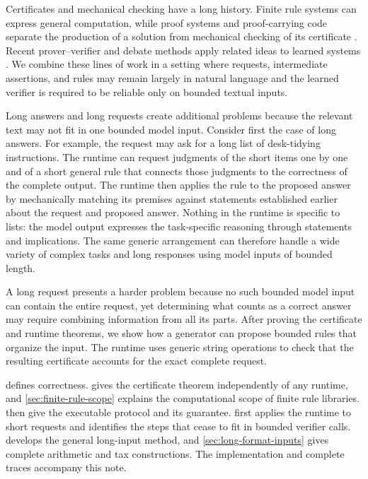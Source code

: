 \documentclass[11pt,twoside]{article}
\theoremstyle{definition}
\begin{document}
Certificates and mechanical checking have a long history. Finite rule systems
can express general computation, while proof systems and proof-carrying code
separate the production of a solution from mechanical checking of its
certificate \cite{post,cook-reckhow,necula-pcc}. Recent prover--verifier and
debate methods apply related ideas to learned systems
\cite{cobbe-verifiers,irving-debate,brown-cohen-debate,kirchner-legibility}.
We combine these lines of work in a setting where requests, intermediate
assertions, and rules may remain largely in natural language and the learned
verifier is required to be reliable only on bounded textual inputs.

Long answers and long requests create additional problems because the relevant
text may not fit in one bounded model input. Consider first the case of long answers.
For example, the request may ask for a
long list of desk-tidying instructions. The runtime can request judgments of
the short items one by one and of a short general rule that connects those
judgments to the correctness of the complete output. The runtime
then applies the rule to the proposed answer by mechanically matching its
premises against statements established earlier about the request and proposed
answer. Nothing in the runtime is specific to lists: the model output expresses
the task-specific reasoning through statements and implications. The same generic
arrangement can therefore handle a wide variety of complex tasks and long
responses using model inputs of bounded length.

A long request presents a harder problem because no such bounded model input can
contain the entire request, yet determining what counts as a correct
answer may require combining information from all its parts. After proving
the certificate and runtime theorems, we show how a generator can propose bounded rules
that organize the input. The runtime uses generic string operations to check
that the resulting certificate accounts for the exact complete request.

 defines correctness.  gives the
certificate theorem independently of any runtime, and
\cref{sec:finite-rule-scope} explains the computational scope of finite rule
libraries.  then give the
executable protocol and its guarantee.
 first applies the runtime to short requests and
identifies the steps that cease to fit in bounded verifier calls.
 develops the general long-input method, and
\cref{sec:long-format-inputs} gives complete arithmetic and tax constructions.
The implementation and complete traces accompany this note.
\end{document}
